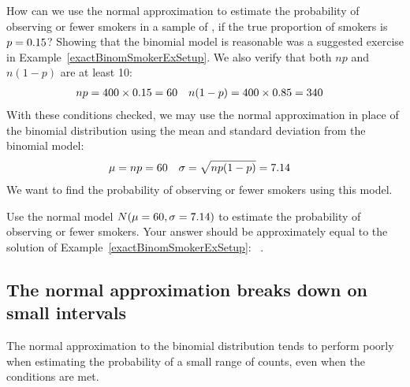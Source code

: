 \begin{examplewrap}
\begin{nexample}{How can we use the normal approximation
    to estimate the probability of observing \smokex{} or
    fewer smokers in a sample of \smoken{}, if the true
    proportion of smokers is $p = 0.15{}$?}
  \label{approxNormalForSmokerBinomEx}
  Showing that the binomial model is reasonable was a
  suggested exercise in Example~\ref{exactBinomSmokerExSetup}.
  We also verify that both $np$ and $n(1-p)$ are at least 10:
  \begin{align*}
  np &= 400{} \times 0.15{} = 60{}
  &n (1 - p) &= 400{} \times 0.85{}
      = 340{}
  \end{align*}
  With these conditions checked, we may use the normal
  approximation in place of the binomial distribution
  using the mean and standard deviation from the binomial
  model:
  \begin{align*}
  \mu &= np = 60{}
  &\sigma &= \sqrt{np(1 - p)} = 7.14{}
  \end{align*}
  We want to find the probability of observing
  \smokex{} or fewer smokers using this model.
\end{nexample}
\end{examplewrap}

\begin{exercisewrap}
\begin{nexercise}
Use the normal model $N(\mu = 60{}, \sigma = 7.14{})$
to estimate the probability of observing \smokex{} or fewer
smokers.
Your answer should be approximately equal to the solution
of Example~\ref{exactBinomSmokerExSetup}:%
~\smokelowertailbinom{}.~\footnotemark{}
\end{nexercise}
\end{exercisewrap}



\newpage


\subsection{The normal approximation breaks down on small intervals}

The normal approximation to the binomial distribution tends to perform poorly when estimating the probability of a small range of counts, even when the conditions are met.

